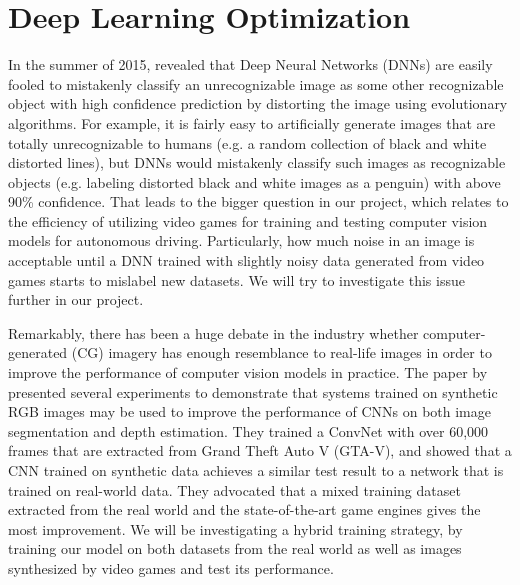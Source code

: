\section{Deep Learning Optimization} 
In the summer of 2015, \cite{Deep-Neural-Networks-are-Easily-Fooled-High-Confidence-Predictions} revealed that Deep Neural Networks (DNNs) are easily fooled to mistakenly classify an unrecognizable image as some other recognizable object with high confidence prediction by distorting the image using evolutionary algorithms. For example, it is fairly easy to artificially generate images that are totally unrecognizable to humans (e.g. a random collection of black and white distorted lines), but DNNs would mistakenly classify such images as recognizable objects (e.g. labeling distorted black and white images as a penguin) with above 90\% confidence. That leads to the bigger question in our project, which relates to the efficiency of utilizing video games for training and testing computer vision models for autonomous driving. Particularly, how much noise in an image is acceptable until a DNN trained with slightly noisy data generated from video games starts to mislabel new datasets. We will try to investigate this issue further in our project. 
\par \bigskip


Remarkably, there has been a huge debate in the industry whether computer-generated (CG) imagery has enough resemblance to real-life images in order to improve the performance of computer vision models in practice. The paper by \cite{Play-and-Learn-Using-Video-Games-to-Train-Computer-Vision-Models} presented several experiments to demonstrate that systems trained on synthetic RGB images may be used to improve the performance of CNNs on both image segmentation and depth estimation. They trained a ConvNet with over 60,000 frames that are extracted from Grand Theft Auto V (GTA-V), and showed that a CNN trained on synthetic data achieves a similar test result to a network that is trained on real-world data. They advocated that a mixed training dataset extracted from the real world and the state-of-the-art game engines gives the most improvement. We will be investigating a hybrid training strategy, by training our model on both datasets from the real world as well as images synthesized by video games and test its performance. 
\par \bigskip


